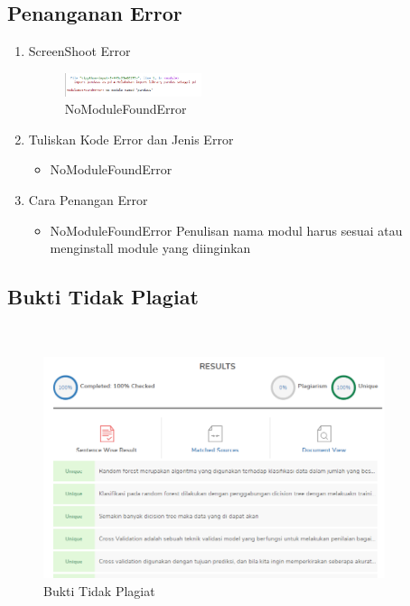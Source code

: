 \subsection{Penanganan Error}
\begin{enumerate}
	\item ScreenShoot Error
	\begin{figure}[H]
		\includegraphics[width=4cm]{figures/1174077/3/error.png}
		\centering
		\caption{NoModuleFoundError}
	\end{figure}
	\item Tuliskan Kode Error dan Jenis Error
	\begin{itemize}
		\item NoModuleFoundError
	\end{itemize}
	\item Cara Penangan Error
	\begin{itemize}
		\item NoModuleFoundError
		\hfill\break
		Penulisan nama modul harus sesuai atau menginstall module yang diinginkan
	\end{itemize}
\end{enumerate}


\subsection{Bukti Tidak Plagiat}
\hfill\\
\begin{figure}[H]
\centerline{\includegraphics[width=10cm]{figures/1174077/3/plagiat.png}}
\caption{Bukti Tidak Plagiat}
\label{labelgambar}
\end{figure}